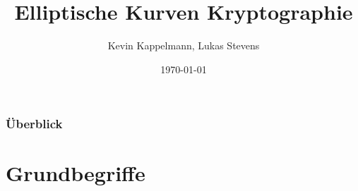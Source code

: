\documentclass{beamer}
\title[Elliptische-Kurven-Kryptographie]{Elliptische Kurven Kryptographie} %
\author{Kevin Kappelmann, Lukas Stevens} %
\institute[TUM] %
{Technische Universität München \\ %
}
\date{\today} %
\theoremstyle{plain}
\theoremstyle{definition}
\theoremstyle{rem}
\begin{document}
\begin{frame}
\titlepage %
\end{frame}




\begin{frame}
	\frametitle{Überblick} %
\tableofcontents %
\end{frame}

\section{Grundbegriffe}
\end{document}
